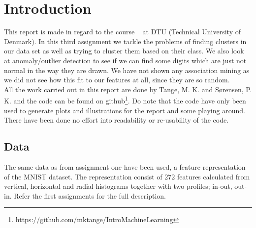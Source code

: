 \chapter{Introduction}
This report is made in regard to the course \textsf{\courseno\ \coursename} at DTU (Technical University of Denmark). In this third assignment we tackle the problems of finding clusters in our data set as well as trying to cluster them based on their class. We also look at anomaly/outlier detection to see if we can find some digits which are just not normal in the way they are drawn. We have not shown any association mining as we did not see how this fit to our features at all, since they are so random. \\


All the work carried out in this report are done by Tange, M. K. and Sørensen, P. K. and the code can be found on github\footnote{https://github.com/mktange/IntroMachineLearning}. Do note that the code have only been used to generate plots and illustrations for the report and some playing around. There have been done no effort into readability or re-usability of the code.

\section{Data}
The same data as from assignment one have been used, a feature representation of the MNIST dataset. The representation consist of 272 features calculated from vertical, horizontal and radial histograms together with two profiles; in-out, out-in. Refer the first assignments for the full description. 

